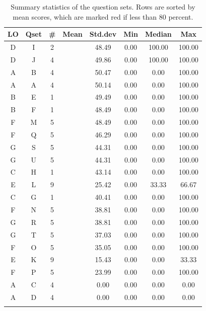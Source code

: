 \documentclass[12pt,english,nohyper]{tufte-handout}\usepackage[]{graphicx}\usepackage[]{color}
\begin{document}
\begin{fullwidth}
\makeatletter\setlength\hsize{\@tufte@fullwidth}\makeatother
\begin{longtable}{cc|ccc|ccc}
  \hline
LO & Qset & \# & Mean & Std.dev & Min & Median & Max \\ 
  \hline
D & I &   2 & \color{red}{64} & 48.49 & 0.00 & 100.00 & 100.00 \\ 
  D & J &   4 & \color{red}{58} & 49.86 & 0.00 & 100.00 & 100.00 \\ 
  A & B &   4 & \color{red}{48} & 50.47 & 0.00 & 0.00 & 100.00 \\ 
  A & A &   4 & \color{red}{44} & 50.14 & 0.00 & 0.00 & 100.00 \\ 
  B & E &   1 & \color{red}{40} & 49.49 & 0.00 & 0.00 & 100.00 \\ 
  B & F &   1 & \color{red}{36} & 48.49 & 0.00 & 0.00 & 100.00 \\ 
  F & M &   5 & \color{red}{36} & 48.49 & 0.00 & 0.00 & 100.00 \\ 
  F & Q &   5 & \color{red}{30} & 46.29 & 0.00 & 0.00 & 100.00 \\ 
  G & S &   5 & \color{red}{26} & 44.31 & 0.00 & 0.00 & 100.00 \\ 
  G & U &   5 & \color{red}{26} & 44.31 & 0.00 & 0.00 & 100.00 \\ 
  C & H &   1 & \color{red}{24} & 43.14 & 0.00 & 0.00 & 100.00 \\ 
  E & L &   9 & \color{red}{23.33} & 25.42 & 0.00 & 33.33 & 66.67 \\ 
  C & G &   1 & \color{red}{20} & 40.41 & 0.00 & 0.00 & 100.00 \\ 
  F & N &   5 & \color{red}{18} & 38.81 & 0.00 & 0.00 & 100.00 \\ 
  G & R &   5 & \color{red}{18} & 38.81 & 0.00 & 0.00 & 100.00 \\ 
  G & T &   5 & \color{red}{16} & 37.03 & 0.00 & 0.00 & 100.00 \\ 
  F & O &   5 & \color{red}{14} & 35.05 & 0.00 & 0.00 & 100.00 \\ 
  E & K &   9 & \color{red}{10} & 15.43 & 0.00 & 0.00 & 33.33 \\ 
  F & P &   5 & \color{red}{6} & 23.99 & 0.00 & 0.00 & 100.00 \\ 
  A & C &   4 & \color{red}{0} & 0.00 & 0.00 & 0.00 & 0.00 \\ 
  A & D &   4 & \color{red}{0} & 0.00 & 0.00 & 0.00 & 0.00 \\ 
   \hline
\hline
\caption{Summary statistics of the question sets. Rows are sorted by mean scores, which are marked red if less than 80 percent.} 
\label{tab:QuestionSet_summary}
\end{longtable}

\end{fullwidth}
\end{document}
